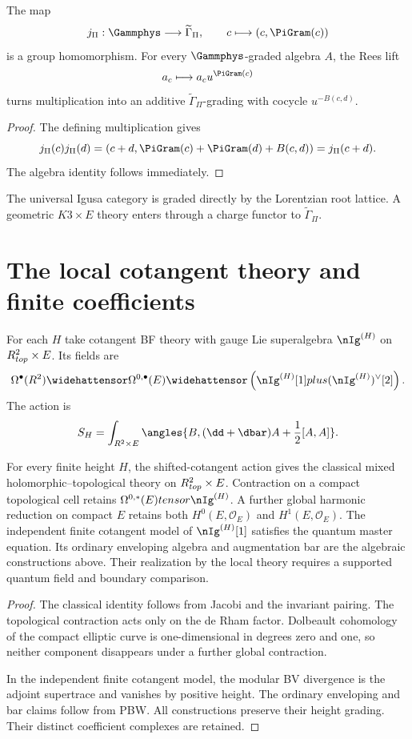 \begin{theorem}
The map
\[
 j_\Pi:\Gammphys\longrightarrow\widetilde\Gamma_\Pi,
 \qquad
 c\longmapsto(c,\PiGram(c))
\]
is a group homomorphism.  For every $\Gammphys$-graded algebra $A$, the Rees lift
\[
 a_c\longmapsto a_cu^{\PiGram(c)}
\]
turns multiplication into an additive $\widetilde\Gamma_\Pi$-grading with cocycle $u^{-B(c,d)}$.
\end{theorem}
\begin{proof}
The defining multiplication gives
\[
 j_\Pi(c)j_\Pi(d)
 =(c+d,\PiGram(c)+\PiGram(d)+B(c,d))
 =j_\Pi(c+d).
\]
The algebra identity follows immediately.
\end{proof}

The universal Igusa category is graded directly by the Lorentzian root lattice.  A geometric $K3\times E$ theory enters through a charge functor to $\widetilde\Gamma_\Pi$.

\chapter{The local cotangent theory and finite coefficients}
For each $H$ take cotangent BF theory with gauge Lie superalgebra $\nIg^{(H)}$ on $R^2_{top}\times E$.  Its fields are
\[
 \Omega^\bullet(\R^2)\widehattensor
 \Omega^{0,\bullet}(E)
 \widehattensor
 \left(\nIg^{(H)}[1]\oplus(\nIg^{(H)})^\vee[2]\right).
\]
The action is
\[
 S_H=\int_{\R^2\times E}
 \angles{B,(\dd+\dbar)A+\frac12[A,A]}.
\]

\begin{theorem}
For every finite height $H$, the shifted-cotangent action gives the classical mixed holomorphic--topological theory on $R^2_{top}\times E$.
Contraction on a compact topological cell retains $\Omega^{0,*}(E)\otimes\nIg^{(H)}$.
A further global harmonic reduction on compact $E$ retains both $H^0(E,\mathcal O_E)$ and $H^1(E,\mathcal O_E)$.
The independent finite cotangent model of $\nIg^{(H)}[1]$ satisfies the quantum master equation.
Its ordinary enveloping algebra and augmentation bar are the algebraic constructions above.
Their realization by the local theory requires a supported quantum field and boundary comparison.
\end{theorem}
\begin{proof}
The classical identity follows from Jacobi and the invariant pairing.
The topological contraction acts only on the de Rham factor.
Dolbeault cohomology of the compact elliptic curve is one-dimensional in degrees zero and one, so neither component disappears under a further global contraction.

In the independent finite cotangent model, the modular BV divergence is the adjoint supertrace and vanishes by positive height.
The ordinary enveloping and bar claims follow from PBW.
All constructions preserve their height grading. Their distinct coefficient complexes are retained.
\end{proof}


